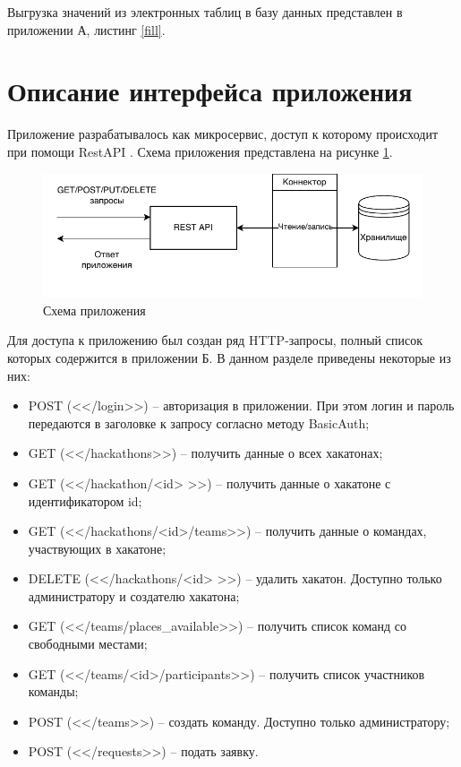 Выгрузка значений из электронных таблиц в базу данных представлен в приложении А, листинг \ref{fill}.


\section{Описание интерфейса приложения}
Приложение разрабатывалось как микросервис, доступ к которому происходит при помощи RestAPI \cite{restapi}. Схема приложения представлена на рисунке \ref{app_architecture}.

\begin{figure}[H]
	\begin{center}
		\includegraphics[page=1,scale=1]{assets/app_architecture.drawio.pdf}
	\end{center}
	\caption{Схема приложения}
	\label{app_architecture}
\end{figure}

Для доступа к приложению был создан ряд HTTP-запросы, полный список которых содержится в приложении Б. В данном разделе приведены некоторые из них:

\begin{itemize}
    \item POST (<</login>>) -- авторизация в приложении. При этом логин и пароль передаются в заголовке к запросу согласно методу BasicAuth\cite{basicauth};
    \item GET (<</hackathons>>) -- получить данные о всех хакатонах;
    \item GET (<</hackathon/<id> >>) -- получить данные о хакатоне с идентификатором id;
    \item GET (<</hackathons/<id>/teams>>) -- получить данные о командах, 
    участвующих в хакатоне;
    \item DELETE (<</hackathons/<id> >>) -- удалить хакатон. Доступно только администратору и создателю хакатона;
    \item GET (<</teams/places\_available>>) -- получить список команд со свободными местами;
    \item GET (<</teams/<id>/participants>>) -- получить список участников команды;
    \item POST (<</teams>>) -- создать команду. Доступно только администратору;
    \item POST (<</requests>>) -- подать заявку.
\end{itemize}

